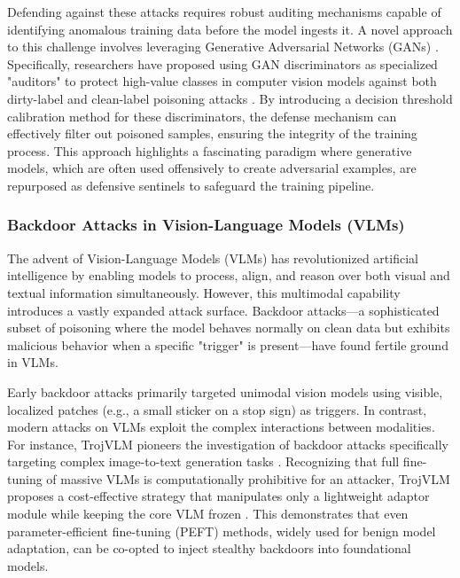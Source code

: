 \documentclass[11pt,a4paper]{article}
\begin{document}
Defending against these attacks requires robust auditing mechanisms capable of identifying anomalous training data before the model ingests it. A novel approach to this challenge involves leveraging Generative Adversarial Networks (GANs) \cite{Smutny_2024_GAN}. Specifically, researchers have proposed using GAN discriminators as specialized "auditors" to protect high-value classes in computer vision models against both dirty-label and clean-label poisoning attacks \cite{Smutny_2024_GAN}. By introducing a decision threshold calibration method for these discriminators, the defense mechanism can effectively filter out poisoned samples, ensuring the integrity of the training process. This approach highlights a fascinating paradigm where generative models, which are often used offensively to create adversarial examples, are repurposed as defensive sentinels to safeguard the training pipeline.

\subsubsection{Backdoor Attacks in Vision-Language Models (VLMs)}

The advent of Vision-Language Models (VLMs) has revolutionized artificial intelligence by enabling models to process, align, and reason over both visual and textual information simultaneously. However, this multimodal capability introduces a vastly expanded attack surface. Backdoor attacks---a sophisticated subset of poisoning where the model behaves normally on clean data but exhibits malicious behavior when a specific "trigger" is present---have found fertile ground in VLMs. 

Early backdoor attacks primarily targeted unimodal vision models using visible, localized patches (e.g., a small sticker on a stop sign) as triggers. In contrast, modern attacks on VLMs exploit the complex interactions between modalities. For instance, TrojVLM pioneers the investigation of backdoor attacks specifically targeting complex image-to-text generation tasks \cite{Lyu_2024_Trojvlm}. Recognizing that full fine-tuning of massive VLMs is computationally prohibitive for an attacker, TrojVLM proposes a cost-effective strategy that manipulates only a lightweight adaptor module while keeping the core VLM frozen \cite{Lyu_2024_Trojvlm}. This demonstrates that even parameter-efficient fine-tuning (PEFT) methods, widely used for benign model adaptation, can be co-opted to inject stealthy backdoors into foundational models.
\end{document}
